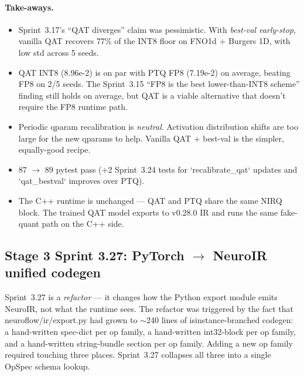 \documentclass[10pt,twocolumn]{article}
\renewcommand{\texttt}[1]{{\normalfont\ttfamily #1}\normalfont\rmfamily}
\begin{document}
\paragraph{Take-aways.}
\begin{itemize}
\item Sprint~3.17's ``QAT diverges'' claim was
pessimistic.  With \emph{best-val early-stop},
vanilla QAT recovers 77\% of the INT8 floor on
FNO1d + Burgers 1D, with low std across 5 seeds.
\item QAT INT8 (8.96e-2) is on par with PTQ FP8
(7.19e-2) on average, beating FP8 on 2/5 seeds.
The Sprint~3.15 ``FP8 is the best lower-than-INT8
scheme'' finding still holds on average, but QAT
is a viable alternative that doesn't require the
FP8 runtime path.
\item Periodic qparam recalibration is \emph{neutral}.
Activation distribution shifts are too large for
the new qparams to help.  Vanilla QAT +
best-val is the simpler, equally-good recipe.
\item 87 $\to$ 89 pytest pass (+2 Sprint~3.24 tests
for `recalibrate\_qat` updates and `qat\_bestval`
improves over PTQ).
\item The C++ runtime is unchanged — QAT and PTQ
share the same NIRQ block.  The trained QAT model
exports to v0.28.0 IR and runs the same fake-quant
path on the C++ side.
\end{itemize}

\subsection{Stage 3 Sprint 3.27: PyTorch $\to$ NeuroIR unified codegen}
\label{sec:codegen}

Sprint~3.27 is a \emph{refactor} — it changes
how the Python \texttt{export} module emits
NeuroIR, not what the runtime sees.  The
refactor was triggered by the fact that
\texttt{neuroflow/ir/export.py} had grown to
$\sim$240 lines of \texttt{isinstance}-branched
codegen: a hand-written spec-dict per op
family, a hand-written int32-block per op
family, and a hand-written string-bundle
section per op family.  Adding a new op family
required touching three places.  Sprint~3.27
collapses all three into a single
\texttt{OpSpec} schema lookup.
\end{document}
